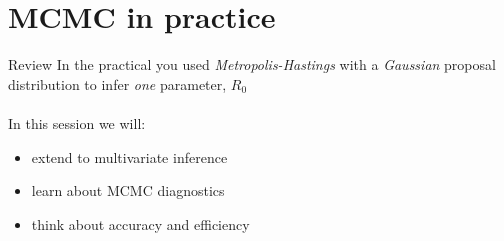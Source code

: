 \documentclass[compress]{beamer}
\begin{document}
\section{MCMC in practice}
\label{sec-8}
\begin{frame}[label=sec-8-1]{Review}
    In the practical you used \textit{Metropolis-Hastings} with a \textit{Gaussian} proposal distribution to infer \textit{one} parameter, $R_0$\\~\\

    In this session we will:
    \begin{itemize}
        \item extend to multivariate inference
        \item learn about MCMC diagnostics
        \item think about accuracy and efficiency
    \end{itemize}
\end{frame}
\end{document}
